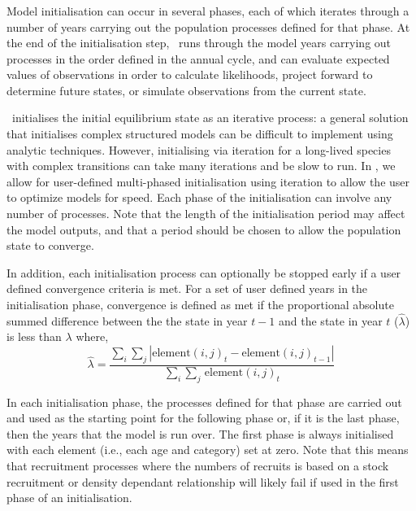 \subsubsection{}

Model initialisation can occur in several phases, each of which iterates through a number of years carrying out the population processes defined for that phase. At the end of the initialisation step, \iSAM\ runs through the model years carrying out processes in the order defined in the annual cycle, and can evaluate expected values of observations in order to calculate likelihoods, project forward to determine future states,
or simulate observations from the current state.

\iSAM\ initialises the initial equilibrium state as an iterative process: a general solution that initialises complex structured models can be difficult to implement using analytic techniques. However, initialising via iteration for a long-lived species with complex transitions can take many iterations and be slow to run. In \iSAM, we allow for user-defined multi-phased initialisation using iteration to allow the user to optimize models for speed. Each phase of the initialisation can involve any number of processes. Note that the length of the initialisation period may affect the model outputs, and that a period should be chosen to allow the population state to converge.

In addition, each initialisation process can optionally be stopped early if a user defined convergence criteria is met. For a set of user defined years in the initialisation phase, convergence is defined as met if the proportional absolute summed difference between the the state in year $t-1$ and the state in year $t$ ($\widehat{\lambda}$) is less than $\lambda$ where, 
\begin{equation}
  \widehat{\lambda} = \frac{\sum\limits_{i} \sum\limits_{j} \left|\text{element}(i,j)_t - \text{element}(i,j)_{t-1} \right|}{\sum\limits_{i} \sum\limits_{j} \frac{}{}\text{element}(i,j)_t}
\end{equation}

In each initialisation phase, the processes defined for that phase are carried out and used as the starting point for the following phase or, if it is the last phase, then the years that the model is run over. The first phase is always initialised with each element (i.e., each age and category) set at zero. Note that this means that recruitment processes where the numbers of recruits is based on a stock recruitment or density dependant relationship will likely fail if used in the first phase of an initialisation. 

